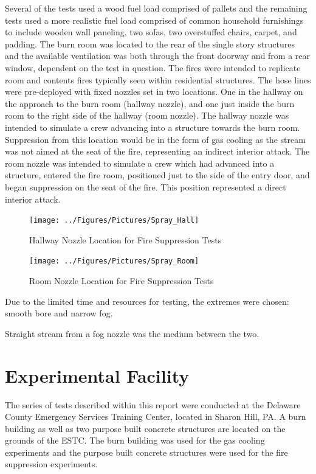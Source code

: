 \documentclass[12pt,oneside]{book}
\begin{document}
Several of the tests used a wood fuel load comprised of pallets and the remaining tests used a more realistic fuel load comprised of common household furnishings to include wooden wall paneling, two sofas, two overstuffed chairs, carpet, and padding.  The burn room was located to the rear of the single story structures and the available ventilation was both through the front doorway and from a rear window, dependent on the test in question.  The fires were intended to replicate room and contents fires typically seen within residential structures.  The hose lines were pre-deployed with fixed nozzles set in two locations.  One in the hallway on the approach to the burn room (hallway nozzle), and one just inside the burn room to the right side of the hallway (room nozzle). The hallway nozzle was intended to simulate a crew advancing into a structure towards the burn room. Suppression from this location would be in the form of gas cooling as the stream was not aimed at the seat of the fire, representing an indirect interior attack. The room nozzle was intended to simulate a crew which had advanced into a structure, entered the fire room, positioned just to the side of the entry door, and began suppression on the seat of the fire.  This position represented a direct interior attack.

\begin{figure}[!ht]
	\texttt{[image: ../Figures/Pictures/Spray\_Hall]}
	\caption{Hallway Nozzle Location for Fire Suppression Tests}
	\label{fig:Hallway_Nozzle_Location_Fire_Suppression_Tests}
\end{figure}

\begin{figure}[!ht]
	\texttt{[image: ../Figures/Pictures/Spray\_Room]}
	\caption{Room Nozzle Location for Fire Suppression Tests}
	\label{fig:Room_Nozzle_Location_Fire_Suppression_Tests}
\end{figure}

Due to the limited time and resources for testing, the extremes were chosen: smooth bore and narrow fog.

Straight stream from a fog nozzle was the medium between the two.

\section{Experimental Facility}
\label{sec:Experimental_Facility}

The series of tests described within this report were conducted at the Delaware County Emergency Services Training Center, located in Sharon Hill, PA. A burn building as well as two purpose built concrete structures are located on the grounds of the ESTC. The burn building was used for the gas cooling experiments and the purpose built concrete structures were used for the fire suppression experiments.   
\end{document}
